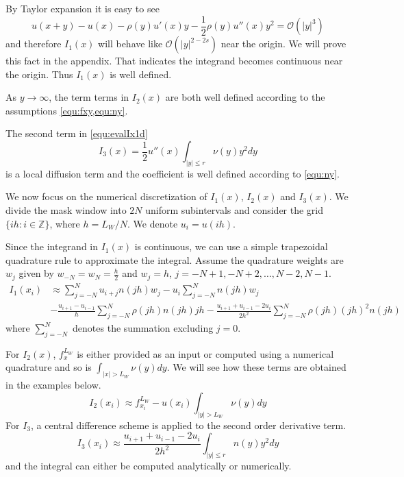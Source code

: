 \documentclass[10pt,a4paper]{article}
\theoremstyle{definition}
\begin{document}
By Taylor expansion it is easy to see
\begin{equation}
	u(x+y)-u(x)-\rho(y)u'(x)y- \frac{1}{2}\rho(y)u''(x)y^2 =\mathcal{O}(|y|^3)
\end{equation}
and therefore $I_1(x)$ will behave like $\mathcal{O}(|y|^{2-2s})$ near the origin. We will prove this fact in the appendix. That indicates the integrand becomes continuous near the origin. Thus $I_1(x)$ is well defined.   

As $y\rightarrow \infty$, the term terms in $I_2(x)$ are both well defined according to the assumptions \cref{equ:fxy,equ:ny}. 

The second term in \cref{equ:evalIx1d} 
\begin{equation}
	I_3(x) = \frac{1}{2}u''(x)\int_{|y|\leq r}\nu(y)y^2 dy
\end{equation}
is a local diffusion term and the coefficient is well defined according to \cref{equ:ny}.

We now focus on the numerical discretization of $I_1(x)$, $I_2(x)$ and $I_3(x)$. We divide the mask window into $2N$ uniform subintervals and consider the grid $\{ih:i\in\mathbb{Z} \}$, where $h = L_W/N$. We denote $u_i = u(ih)$.

Since the integrand in $I_1(x)$ is continuous, we can use a simple trapezoidal quadrature rule to approximate the integral. Assume the quadrature weights are $w_j$ given by $w_{-N}=w_N = \frac{h}{2}$ and $w_j=h$, $j=-N+1, -N+2, \ldots, N-2, N-1$.
\begin{equation}\label{equ:I1approx}
  \begin{aligned}
	I_1(x_i) &\approx \sum\limits_{j =  - N}^N {{u_{i + j}}n(jh){w_j}}  - {u_i}\sum\limits_{j =  - N}^N {n(jh){w_j}} \\
	& - \frac{{{u_{i + 1}} - {u_{i - 1}}}}{h}\sum\limits_{j =  - N}^N {\rho (jh)n(jh)jh}  - \frac{{{u_{i + 1}} + {u_{i - 1}} - 2{u_i}}}{{2{h^2}}}\sum\limits_{j =  - N}^N {\rho (jh){{(jh)}^2}n(jh)} 
\end{aligned}
\end{equation}
where $\sum\limits_{j =  - N}^N$ denotes the summation excluding $j=0$. 

For $I_2(x)$, $f_x^{L_W}$ is either provided as an input or computed using a numerical quadrature and so is $\int_{|x|>L_W} \nu(y)dy$. We will see how these terms are obtained in the examples below. 
\begin{equation}\label{equ:I2approx}
	I_2(x_i)\approx f_{x_i}^{L_W} - u(x_i)\int_{|y|> L_W}\nu(y)dy
\end{equation}
For $I_3$, a central difference scheme is applied to the second order derivative term. 
\begin{equation}\label{equ:I3approx}
	I_3(x_i)\approx \frac{{{u_{i + 1}} + {u_{i - 1}} - 2{u_i}}}{{2{h^2}}}\int_{|y| \leqslant r} n (y){y^2}dy
\end{equation}
and the integral can either be computed analytically or numerically. 
\end{document}
